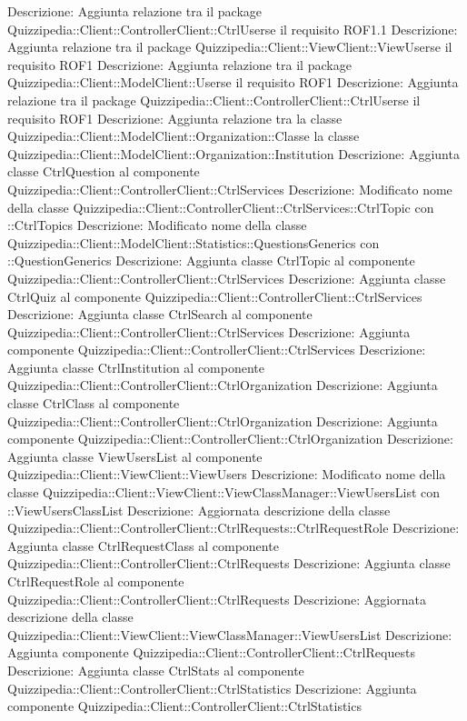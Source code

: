 Descrizione: Aggiunta relazione tra il package Quizzipedia::Client::ControllerClient::CtrlUserse il requisito ROF1.1 
Descrizione: Aggiunta relazione tra il package Quizzipedia::Client::ViewClient::ViewUserse il requisito ROF1 
Descrizione: Aggiunta relazione tra il package Quizzipedia::Client::ModelClient::Userse il requisito ROF1 
Descrizione: Aggiunta relazione tra il package Quizzipedia::Client::ControllerClient::CtrlUserse il requisito ROF1 
Descrizione: Aggiunta relazione tra la classe Quizzipedia::Client::ModelClient::Organization::Classe la classe Quizzipedia::Client::ModelClient::Organization::Institution 
Descrizione: Aggiunta classe CtrlQuestion al componente Quizzipedia::Client::ControllerClient::CtrlServices 
Descrizione: Modificato nome della classe Quizzipedia::Client::ControllerClient::CtrlServices::CtrlTopic con ::CtrlTopics 
Descrizione: Modificato nome della classe Quizzipedia::Client::ModelClient::Statistics::QuestionsGenerics con ::QuestionGenerics 
Descrizione: Aggiunta classe CtrlTopic al componente Quizzipedia::Client::ControllerClient::CtrlServices 
Descrizione: Aggiunta classe CtrlQuiz al componente Quizzipedia::Client::ControllerClient::CtrlServices 
Descrizione: Aggiunta classe CtrlSearch al componente Quizzipedia::Client::ControllerClient::CtrlServices 
Descrizione: Aggiunta componente Quizzipedia::Client::ControllerClient::CtrlServices 
Descrizione: Aggiunta classe CtrlInstitution al componente Quizzipedia::Client::ControllerClient::CtrlOrganization 
Descrizione: Aggiunta classe CtrlClass al componente Quizzipedia::Client::ControllerClient::CtrlOrganization 
Descrizione: Aggiunta componente Quizzipedia::Client::ControllerClient::CtrlOrganization 
Descrizione: Aggiunta classe ViewUsersList al componente Quizzipedia::Client::ViewClient::ViewUsers 
Descrizione: Modificato nome della classe Quizzipedia::Client::ViewClient::ViewClassManager::ViewUsersList con ::ViewUsersClassList 
Descrizione: Aggiornata descrizione della classe Quizzipedia::Client::ControllerClient::CtrlRequests::CtrlRequestRole 
Descrizione: Aggiunta classe CtrlRequestClass al componente Quizzipedia::Client::ControllerClient::CtrlRequests 
Descrizione: Aggiunta classe CtrlRequestRole al componente Quizzipedia::Client::ControllerClient::CtrlRequests 
Descrizione: Aggiornata descrizione della classe Quizzipedia::Client::ViewClient::ViewClassManager::ViewUsersList 
Descrizione: Aggiunta componente Quizzipedia::Client::ControllerClient::CtrlRequests 
Descrizione: Aggiunta classe CtrlStats al componente Quizzipedia::Client::ControllerClient::CtrlStatistics 
Descrizione: Aggiunta componente Quizzipedia::Client::ControllerClient::CtrlStatistics 
